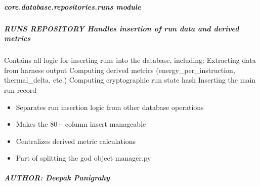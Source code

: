 \documentclass[letterpaper,10pt,english]{sphinxmanual}
\begin{document}
\sphinxstepscope


\subparagraph{core.database.repositories.runs module}
\label{\detokenize{core.database.repositories.runs:module-core.database.repositories.runs}}\label{\detokenize{core.database.repositories.runs:core-database-repositories-runs-module}}\label{\detokenize{core.database.repositories.runs::doc}}

\subparagraph{RUNS REPOSITORY \textendash{} Handles insertion of run data and derived metrics}
\label{\detokenize{core.database.repositories.runs:runs-repository-handles-insertion-of-run-data-and-derived-metrics}}\begin{description}
\sphinxAtStartPar
Contains all logic for inserting runs into the database, including:
\sphinxhyphen{} Extracting data from harness output
\sphinxhyphen{} Computing derived metrics (energy\_per\_instruction, thermal\_delta, etc.)
\sphinxhyphen{} Computing cryptographic run state hash
\sphinxhyphen{} Inserting the main run record

\begin{itemize}
\item {} 
\sphinxAtStartPar
Separates run insertion logic from other database operations

\item {} 
\sphinxAtStartPar
Makes the 80+ column insert manageable

\item {} 
\sphinxAtStartPar
Centralizes derived metric calculations

\item {} 
\sphinxAtStartPar
Part of splitting the god object manager.py

\end{itemize}

\end{description}


\subparagraph{AUTHOR: Deepak Panigrahy}
\label{\detokenize{core.database.repositories.runs:author-deepak-panigrahy}}
\end{document}
